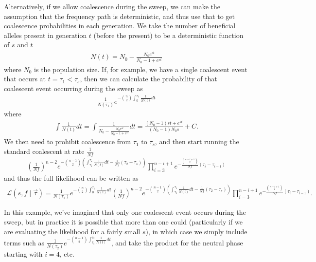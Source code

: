 \documentclass[reqno]{amsart}
\begin{document}
Alternatively, if we allow coalescence during the sweep, we can make the assumption that the frequency path is deterministic, and thus use that to get coalescence probabilities in each generation. We take the number of beneficial alleles present in generation $t$ (before the present) to be a deterministic function of $s$ and $t$
\begin{align}
	N(t) = N_0 - \frac{N_0 e^{st}}{N_0-1+e^{st}} 
\end{align}
where $N_0$ is the population size. If, for example, we have a single coalescent event that occurs at $t=\tau_1<\tau_s$, then we can calculate the probability of that coalescent event occurring during the sweep as 
\begin{align}
	\frac{1}{N(\tau_1)}e^{-\binom{n}{2}\int_0^{\tau_1}\frac{1}{N(t)}dt}
\end{align}
where
\begin{align}
	\int\frac{1}{N(t)}dt = \int\frac{1}{N_0 - \frac{N_0e^{st}}{N_0 - 1 + e^{st}}}dt = \frac{\left(N_0-1\right)st + e^{st}}{\left(N_0-1\right)N_0s} + C.
\end{align}
We then need to prohibit coalescence from $\tau_1$ to $\tau_s$, and then start running the standard coalescent at rate $\frac{1}{Nf}$
\begin{align}
	\left(\frac{1}{Nf}\right)^{n-2}e^{-\binom{n-1}{2}\left(\int_{\tau_1}^{\tau_s}\frac{1}{N(t)}dt-\frac{1}{Nf}\left(\tau_2-\tau_{s}\right)\right)}\prod_{i=3}^{n-i+1}e^{-\frac{\binom{n-i+1}{2}}{Nf}\left(\tau_i-\tau_{i-1}\right)}
\end{align}
and thus the full likelihood can be written as
\begin{align}
	\mathcal{L}(s,f\mid \vec{\tau})=\frac{1}{N(\tau_1)}e^{-\binom{n}{2}\int_0^{\tau_1}\frac{1}{N(t)}dt}\left(\frac{1}{Nf}\right)^{n-2}e^{-\binom{n-1}{2}\left(\int_{\tau_1}^{\tau_s}\frac{1}{N(t)}dt-\frac{1}{Nf}\left(\tau_2-\tau_{s}\right)\right)}\prod_{i=3}^{n-i+1}e^{-\frac{\binom{n-i+1}{2}}{Nf}\left(\tau_i-\tau_{i-1}\right)}.
\end{align}

In this example, we've imagined that only one coalescent event occurs during the sweep, but in practice it is possible that more than one could (particularly if we are evaluating the likelihood for a fairly small $s$), in which case we simply include terms such as $\frac{1}{N(\tau_2)}e^{-\binom{n-1}{2}\int_{\tau_1}^{\tau_2}\frac{1}{N(t)}dt}$, and take the product for the neutral phase starting with $i=4$, etc.


\end{document}
